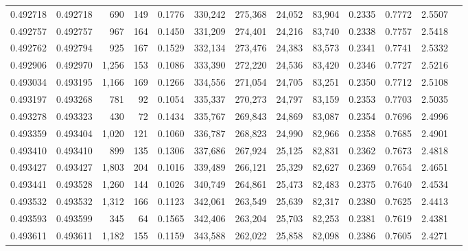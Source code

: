 \begin{tabular}{rrrrrrrrrrrrr}
0.492718 & 0.492718 &   690 &   149 &                                     0.1776 & 330,242 & 275,368 &  24,052 &  83,904 & 0.2335 & 0.7772 & 2.5507 \\
0.492757 & 0.492757 &   967 &   164 &                                     0.1450 & 331,209 & 274,401 &  24,216 &  83,740 & 0.2338 & 0.7757 & 2.5418 \\
0.492762 & 0.492794 &   925 &   167 &                                     0.1529 & 332,134 & 273,476 &  24,383 &  83,573 & 0.2341 & 0.7741 & 2.5332 \\
0.492906 & 0.492970 & 1,256 &   153 &                                     0.1086 & 333,390 & 272,220 &  24,536 &  83,420 & 0.2346 & 0.7727 & 2.5216 \\
0.493034 & 0.493195 & 1,166 &   169 &                                     0.1266 & 334,556 & 271,054 &  24,705 &  83,251 & 0.2350 & 0.7712 & 2.5108 \\
0.493197 & 0.493268 &   781 &    92 &                                     0.1054 & 335,337 & 270,273 &  24,797 &  83,159 & 0.2353 & 0.7703 & 2.5035 \\
0.493278 & 0.493323 &   430 &    72 &                                     0.1434 & 335,767 & 269,843 &  24,869 &  83,087 & 0.2354 & 0.7696 & 2.4996 \\
0.493359 & 0.493404 & 1,020 &   121 &                                     0.1060 & 336,787 & 268,823 &  24,990 &  82,966 & 0.2358 & 0.7685 & 2.4901 \\
0.493410 & 0.493410 &   899 &   135 &                                     0.1306 & 337,686 & 267,924 &  25,125 &  82,831 & 0.2362 & 0.7673 & 2.4818 \\
0.493427 & 0.493427 & 1,803 &   204 &                                     0.1016 & 339,489 & 266,121 &  25,329 &  82,627 & 0.2369 & 0.7654 & 2.4651 \\
0.493441 & 0.493528 & 1,260 &   144 &                                     0.1026 & 340,749 & 264,861 &  25,473 &  82,483 & 0.2375 & 0.7640 & 2.4534 \\
0.493532 & 0.493532 & 1,312 &   166 &                                     0.1123 & 342,061 & 263,549 &  25,639 &  82,317 & 0.2380 & 0.7625 & 2.4413 \\
0.493593 & 0.493599 &   345 &    64 &                                     0.1565 & 342,406 & 263,204 &  25,703 &  82,253 & 0.2381 & 0.7619 & 2.4381 \\
0.493611 & 0.493611 & 1,182 &   155 &                                     0.1159 & 343,588 & 262,022 &  25,858 &  82,098 & 0.2386 & 0.7605 & 2.4271 \\

\end{tabular}
